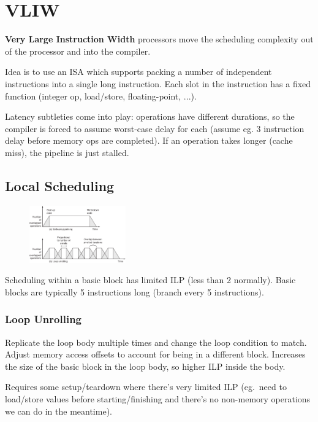 \documentclass[11pt]{article}
\begin{document}
\section*{VLIW}
{
    \textbf{Very Large Instruction Width} processors move the scheduling complexity out of the processor and into the compiler.

    Idea is to use an ISA which supports packing a number of independent instructions into a single long instruction. Each slot in the instruction has a fixed function (integer op, load/store, floating-point, ...).

    Latency subtleties come into play: operations have different durations, so the compiler is forced to assume worst-case delay for each (assume eg. 3 instruction delay before memory ops are completed). If an operation takes longer (cache miss), the pipeline is just stalled.

    \subsection*{Local Scheduling}
    {
        \begin{figure}
        \centering
        \includegraphics[width=0.37\textwidth]{software-pipelining.png}
        \end{figure}

        Scheduling within a basic block has limited ILP (less than 2 normally). Basic blocks are typically 5 instructions long (branch every 5 instructions).

        \subsubsection*{Loop Unrolling}
        {
            Replicate the loop body multiple times and change the loop condition to match. Adjust memory access offsets to account for being in a different block. Increases the size of the basic block in the loop body, so higher ILP inside the body.

            Requires some setup/teardown where there's very limited ILP (eg.\ need to load/store values before starting/finishing and there's no non-memory operations we can do in the meantime).
        }
}}
\end{document}
